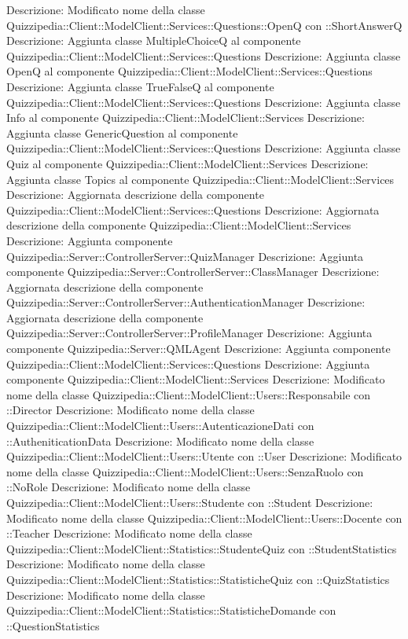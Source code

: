Descrizione: Modificato nome della classe Quizzipedia::Client::ModelClient::Services::Questions::OpenQ con ::ShortAnswerQ 
Descrizione: Aggiunta classe MultipleChoiceQ al componente Quizzipedia::Client::ModelClient::Services::Questions 
Descrizione: Aggiunta classe OpenQ al componente Quizzipedia::Client::ModelClient::Services::Questions 
Descrizione: Aggiunta classe TrueFalseQ al componente Quizzipedia::Client::ModelClient::Services::Questions 
Descrizione: Aggiunta classe Info al componente Quizzipedia::Client::ModelClient::Services 
Descrizione: Aggiunta classe GenericQuestion al componente Quizzipedia::Client::ModelClient::Services::Questions 
Descrizione: Aggiunta classe Quiz al componente Quizzipedia::Client::ModelClient::Services 
Descrizione: Aggiunta classe Topics al componente Quizzipedia::Client::ModelClient::Services 
Descrizione: Aggiornata descrizione della componente Quizzipedia::Client::ModelClient::Services::Questions 
Descrizione: Aggiornata descrizione della componente Quizzipedia::Client::ModelClient::Services 
Descrizione: Aggiunta componente Quizzipedia::Server::ControllerServer::QuizManager 
Descrizione: Aggiunta componente Quizzipedia::Server::ControllerServer::ClassManager 
Descrizione: Aggiornata descrizione della componente Quizzipedia::Server::ControllerServer::AuthenticationManager 
Descrizione: Aggiornata descrizione della componente Quizzipedia::Server::ControllerServer::ProfileManager 
Descrizione: Aggiunta componente Quizzipedia::Server::QMLAgent 
Descrizione: Aggiunta componente Quizzipedia::Client::ModelClient::Services::Questions 
Descrizione: Aggiunta componente Quizzipedia::Client::ModelClient::Services 
Descrizione: Modificato nome della classe Quizzipedia::Client::ModelClient::Users::Responsabile con ::Director 
Descrizione: Modificato nome della classe Quizzipedia::Client::ModelClient::Users::AutenticazioneDati con ::AutheniticationData 
Descrizione: Modificato nome della classe Quizzipedia::Client::ModelClient::Users::Utente con ::User 
Descrizione: Modificato nome della classe Quizzipedia::Client::ModelClient::Users::SenzaRuolo con ::NoRole 
Descrizione: Modificato nome della classe Quizzipedia::Client::ModelClient::Users::Studente con ::Student 
Descrizione: Modificato nome della classe Quizzipedia::Client::ModelClient::Users::Docente con ::Teacher 
Descrizione: Modificato nome della classe Quizzipedia::Client::ModelClient::Statistics::StudenteQuiz con ::StudentStatistics 
Descrizione: Modificato nome della classe Quizzipedia::Client::ModelClient::Statistics::StatisticheQuiz con ::QuizStatistics 
Descrizione: Modificato nome della classe Quizzipedia::Client::ModelClient::Statistics::StatisticheDomande con ::QuestionStatistics 
